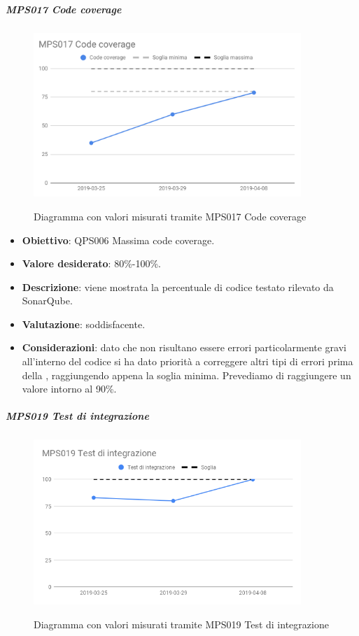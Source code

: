 	\subparagraph{MPS017 Code coverage}
	
	\begin{figure}[H]
		\centering
		\includegraphics[width=0.9\textwidth]{img/cruscotti/RQ/MPS017.png}
		\label{immagineCodeCoverageRQ}
		\caption{Diagramma con valori misurati tramite MPS017 Code coverage}
	\end{figure}
	
	\begin{itemize}
		\item \textbf{Obiettivo}: QPS006 Massima code coverage.
		\item \textbf{Valore desiderato}: 80\%-100\%.
		\item \textbf{Descrizione}: viene mostrata la percentuale di codice testato rilevato da SonarQube.
		\item \textbf{Valutazione}: soddisfacente.
		\item \textbf{Considerazioni}: dato che non risultano essere errori particolarmente gravi all'interno del codice si ha dato priorità a correggere altri tipi di errori prima della \RQ, raggiungendo appena la soglia minima.
		Prevediamo di raggiungere un valore intorno al 90\%.
	\end{itemize}
    
    \subparagraph{MPS019 Test di integrazione}
    
    \begin{figure}[H]
        \centering
        \includegraphics[width=0.9\textwidth]{img/cruscotti/RQ/MPS019.png}
        \label{immagineTestIntegrazioneRQ}
        \caption{Diagramma con valori misurati tramite MPS019 Test di integrazione}
    \end{figure}
    
